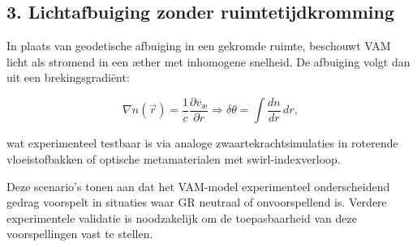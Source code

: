 \subsection*{3. Lichtafbuiging zonder ruimtetijdkromming}

In plaats van geodetische afbuiging in een gekromde ruimte, beschouwt VAM licht als stromend in een æther met inhomogene snelheid. De afbuiging volgt dan uit een brekingsgradiënt:

\begin{equation}
    \nabla n(\vec{r}) = \frac{1}{c} \frac{\partial v_\text{\ae}}{\partial r} \Rightarrow \delta \theta = \int \frac{dn}{dr} \, dr,
    \label{eq:light_bending}
\end{equation}

wat experimenteel testbaar is via analoge zwaartekrachtsimulaties in roterende vloeistofbakken of optische metamaterialen met swirl-indexverloop.

\bigskip

Deze scenario's tonen aan dat het VAM-model experimenteel onderscheidend gedrag voorspelt in situaties waar GR neutraal of onvoorspellend is. Verdere experimentele validatie is noodzakelijk om de toepasbaarheid van deze voorspellingen vast te stellen.